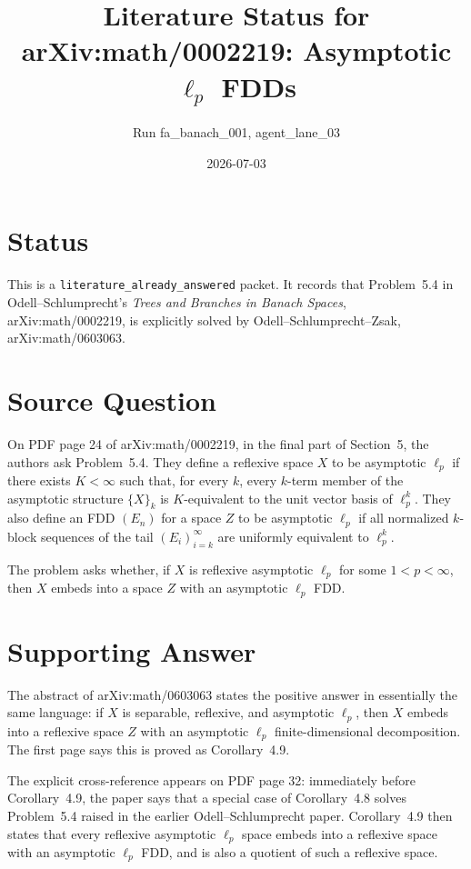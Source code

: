 \documentclass[11pt]{article}
\title{Literature Status for arXiv:math/0002219: Asymptotic \(\ell_p\) FDDs}
\author{Run fa\_banach\_001, agent\_lane\_03}
\date{2026-07-03}
\begin{document}
\maketitle

\section*{Status}

This is a \texttt{literature\_already\_answered} packet.  It records that
Problem~5.4 in Odell--Schlumprecht's \emph{Trees and Branches in Banach
Spaces}, arXiv:math/0002219, is explicitly solved by
Odell--Schlumprecht--Zsak, arXiv:math/0603063.

\section*{Source Question}

On PDF page 24 of arXiv:math/0002219, in the final part of Section~5, the
authors ask Problem~5.4.  They define a reflexive space \(X\) to be
asymptotic \(\ell_p\) if there exists \(K<\infty\) such that, for every
\(k\), every \(k\)-term member of the asymptotic structure \(\{X\}_k\) is
\(K\)-equivalent to the unit vector basis of \(\ell_p^k\).  They also define
an FDD \((E_n)\) for a space \(Z\) to be asymptotic \(\ell_p\) if all
normalized \(k\)-block sequences of the tail \((E_i)_{i=k}^{\infty}\) are
uniformly equivalent to \(\ell_p^k\).

The problem asks whether, if \(X\) is reflexive asymptotic \(\ell_p\) for
some \(1<p<\infty\), then \(X\) embeds into a space \(Z\) with an asymptotic
\(\ell_p\) FDD.

\section*{Supporting Answer}

The abstract of arXiv:math/0603063 states the positive answer in essentially
the same language: if \(X\) is separable, reflexive, and asymptotic \(\ell_p\),
then \(X\) embeds into a reflexive space \(Z\) with an asymptotic \(\ell_p\)
finite-dimensional decomposition.  The first page says this is proved as
Corollary~4.9.

The explicit cross-reference appears on PDF page 32: immediately before
Corollary~4.9, the paper says that a special case of Corollary~4.8 solves
Problem~5.4 raised in the earlier Odell--Schlumprecht paper.  Corollary~4.9
then states that every reflexive asymptotic \(\ell_p\) space embeds into a
reflexive space with an asymptotic \(\ell_p\) FDD, and is also a quotient of
such a reflexive space.
\end{document}
